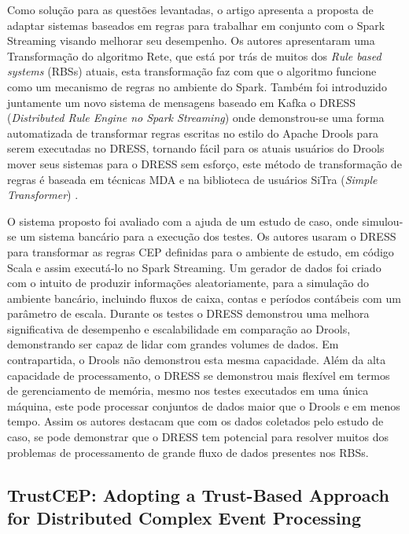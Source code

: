 \documentclass[ti,table]{texufpel} %
\begin{document}
     

    Como solução para as questões levantadas, o artigo apresenta a proposta de adaptar sistemas baseados em regras para trabalhar em conjunto com o Spark Streaming visando melhorar seu desempenho. Os autores apresentaram uma Transformação do algoritmo Rete, que está por trás de muitos dos \textit{Rule based systems} (RBSs) atuais, esta transformação faz com que o algoritmo funcione como um mecanismo de regras no ambiente do Spark. Também foi introduzido juntamente um novo sistema de mensagens baseado em Kafka o DRESS (\textit{Distributed Rule Engine no Spark Streaming}) onde demonstrou-se uma forma automatizada de transformar regras escritas no estilo do Apache Drools para serem executadas no DRESS, tornando fácil para os atuais usuários do Drools mover seus sistemas para o DRESS sem esforço, este método de transformação de regras é baseada em técnicas MDA e na biblioteca de usuários SiTra (\textit{Simple Transformer})  \cite{art5chen2016dress} . 

     

    O sistema proposto foi avaliado com a ajuda de um estudo de caso, onde simulou-se um sistema bancário para a execução dos testes. Os autores usaram o DRESS para transformar as regras CEP definidas para o ambiente de estudo, em código Scala e assim executá-lo no Spark Streaming. Um gerador de dados foi criado com o intuito de produzir informações aleatoriamente, para a simulação do ambiente bancário, incluindo fluxos de caixa, contas e períodos contábeis com um parâmetro de escala. Durante os testes o DRESS demonstrou uma melhora significativa de desempenho e escalabilidade em comparação ao Drools, demonstrando ser capaz de lidar com grandes volumes de dados. Em contrapartida, o Drools não demonstrou esta mesma capacidade. Além da alta capacidade de processamento, o DRESS se demonstrou mais flexível em termos de gerenciamento de memória, mesmo nos testes executados em uma única máquina, este pode processar conjuntos de dados maior que o Drools e em menos tempo. Assim os autores destacam que com os dados coletados pelo estudo de caso, se pode demonstrar que o DRESS tem potencial para resolver muitos dos problemas de processamento de grande fluxo de dados presentes nos RBSs. 

     

  

  

\subsection{TrustCEP: Adopting a Trust-Based Approach for Distributed Complex Event Processing} 
\end{document}
